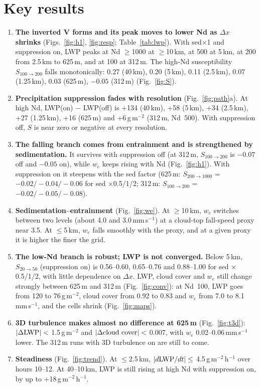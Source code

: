 \documentclass[10pt]{article}
\begin{document}
\section*{Key results}
\begin{enumerate}
\item \textbf{The inverted V forms and its peak moves to lower Nd as $\Delta x$ shrinks} (Figs.~\ref{fig:h1}, \ref{fig:resp}; Table~\ref{tab:lwp}).
With sed$\times$1 and suppression on, LWP peaks at Nd $\geq$1000 at $\geq$10\,km, at 500 at 5\,km, at 200 from 2.5\,km to 625\,m, and at 100 at 312\,m.
The high-Nd susceptibility $S_{100\to200}$ falls monotonically: 0.27 (40\,km), 0.20 (5\,km), 0.11 (2.5\,km), 0.07 (1.25\,km), 0.03 (625\,m), $-0.05$ (312\,m) (Fig.~\ref{fig:S}).
\item \textbf{Precipitation suppression fades with resolution} (Fig.~\ref{fig:path}a). At high Nd, LWP(on) $-$ LWP(off) is +134 (40\,km), +58 (5\,km),
+34 (2.5\,km), +27 (1.25\,km), +16 (625\,m) and +6\,g\,m$^{-2}$ (312\,m, Nd~500). With suppression off, $S$ is near zero or negative at every resolution.
\item \textbf{The falling branch comes from entrainment and is strengthened by sedimentation.} It survives with suppression off
(at 312\,m, $S_{100\to200}$ is $-0.07$ off and $-0.05$ on), while $w_e$ keeps rising with Nd (Fig.~\ref{fig:h1}). With suppression on it steepens with the sed factor
(625\,m: $S_{200\to1000}$ = $-0.02/-0.04/-0.06$ for sed $\times$0.5/1/2; 312\,m: $S_{100\to200}$ = $-0.02/-0.05/-0.08$).
\item \textbf{Sedimentation--entrainment} (Fig.~\ref{fig:we}). At $\geq$10\,km, $w_e$ switches between two levels (about 4.0 and 3.0\,mm\,s$^{-1}$) at a cloud-top
fall-speed proxy near 3.5. At $\leq$5\,km, $w_e$ falls smoothly with the proxy, and at a given proxy it is higher the finer the grid.
\item \textbf{The low-Nd branch is robust; LWP is not converged.} Below 5\,km, $S_{20\to50}$ (suppression on) is 0.56--0.60, 0.65--0.76 and 0.88--1.00 for sed
$\times$0.5/1/2, with little dependence on $\Delta x$. LWP, cloud cover and $w_e$ still change strongly between 625\,m and 312\,m (Fig.~\ref{fig:conv}):
at Nd~100, LWP goes from 120 to 76\,g\,m$^{-2}$, cloud cover from 0.92 to 0.83 and $w_e$ from 7.0 to 8.1\,mm\,s$^{-1}$, and the cells shrink (Fig.~\ref{fig:maps}).
\item \textbf{3D turbulence makes almost no difference at 625\,m} (Fig.~\ref{fig:t3d}): $|\Delta{\rm LWP}| <$ 1.5\,g\,m$^{-2}$ and $|\Delta{\rm cloud\ cover}| <$ 0.007,
with $w_e$ 0.02--0.06\,mm\,s$^{-1}$ lower. The 312\,m runs with 3D turbulence on are still to come.
\item \textbf{Steadiness} (Fig.~\ref{fig:trend}). At $\leq$2.5\,km, $|d{\rm LWP}/dt| \leq$ 4.5\,g\,m$^{-2}$\,h$^{-1}$ over hours 10--12.
At 40--10\,km, LWP is still rising at high Nd with suppression on, by up to +18\,g\,m$^{-2}$\,h$^{-1}$.
\end{enumerate}
\end{document}
